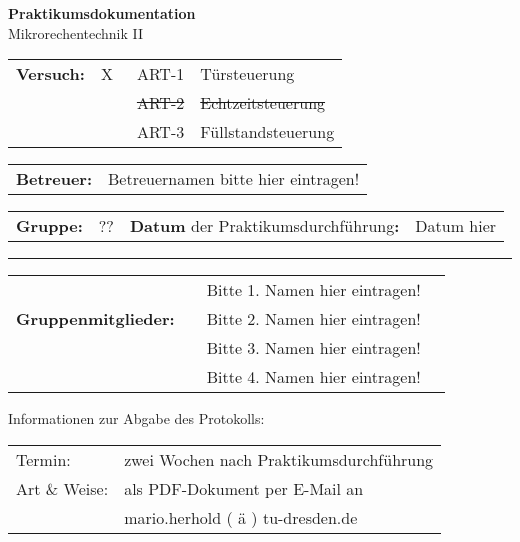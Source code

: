 \documentclass[oneside,a4paper,12pt]{article}
\def\Betreuer{Betreuernamen bitte hier eintragen!}
\def\Gruppennummer{ ??  }
\def\DatumDerDurchführung{Datum hier}
\def\VersuchTuersteuerung{X} %
\def\VersuchEchtzeitsteuerung{ } %
\def\VersuchFuellstandsteuerung{ } %
\def\StudentEins{Bitte 1. Namen hier eintragen!}
\def\StudentZwei{Bitte 2. Namen hier eintragen!}
\def\StudentDrei{Bitte 3. Namen hier eintragen!}
\def\StudentVier{Bitte 4. Namen hier eintragen!}
\begin{document}
\begin{center}
    {\Huge \textbf{Praktikumsdokumentation}\\}
    \bigskip
    {\Large Mikrorechentechnik II}\\
\end{center}

\vfill

\renewcommand{\arraystretch}{1.2}
\begin{tabularx}{\textwidth}{p{2cm} p{0.3cm} p{1.5cm} X}
    \textbf{Versuch:} & \VersuchTuersteuerung & \ ART-1 & Türsteuerung\\ \cline{2-2}
    & \VersuchEchtzeitsteuerung & \ \sout{ART-2} & \sout{Echtzeitsteuerung}\\ \cline{2-2}
    & \VersuchFuellstandsteuerung & \ ART-3 & Füllstandsteuerung\\ \cline{2-2}
\end{tabularx}

\bigskip

\begin{tabularx}{\textwidth}{p{2cm} X}
  \textbf{Betreuer:} & \Betreuer \\ \cline{2-2}
\end{tabularx}

\begin{tabularx}{\textwidth}{p{2cm} p{0.38cm} X p{2.2cm}}
    \textbf{Gruppe:} & \Gruppennummer & \hfill \textbf{Datum} {\small der Praktikumsdurchführung}\textbf{:} & \DatumDerDurchführung \\
  \cline{2-2} \cline{4-4}
\end{tabularx}

\vfill

\renewcommand{\arraystretch}{3}
\rule{\textwidth}{0.5mm}
\begin{tabularx}{\textwidth}{p{4.2cm} | p{0.5cm} X p{0.5cm}}
  & & \StudentEins & \\ \cline{3-3}
  \textbf{Gruppenmitglieder:} & & \StudentZwei & \\  \cline{3-3}
  & & \StudentDrei & \\  \cline{3-3}
  & & \StudentVier & \\  \cline{3-3}
\end{tabularx}

\vfill
\renewcommand{\arraystretch}{1}
Informationen zur Abgabe des Protokolls:\\[0.4cm]
{\small
    \begin{tabularx}{\textwidth}{p{2.5cm} X}
      Termin:           & zwei Wochen nach Praktikumsdurchführung\\
      Art \& Weise:     & als PDF-Dokument per E-Mail an\\
                        & mario.herhold ( ä ) tu-dresden.de\\
    \end{tabularx}}
\end{document}
